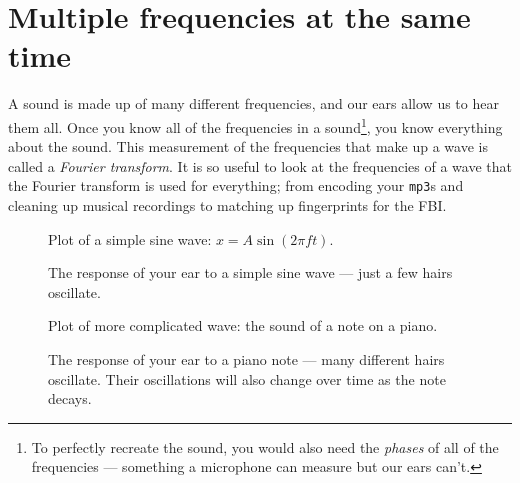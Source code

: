 \documentclass{article}
\begin{document}
\section*{Multiple frequencies at the same time}
A sound is made up of many different frequencies, and our ears allow
us to hear them all.  Once you know all of the frequencies in a
sound\footnote{To perfectly recreate the sound, you would also need
the {\it phases} of all of the frequencies --- something a microphone
can measure but our ears can't.}, you know everything about the sound.
This measurement of the frequencies that make up a wave is called a
{\it Fourier transform}.  It is so useful to look at the frequencies
of a wave that the Fourier transform is used for everything; from
encoding your \verb^mp3^s and cleaning up musical recordings to
matching up fingerprints for the FBI.

\begin{figure}[h]
\begin{center}
	
	\caption{Plot of a simple sine wave: $x = A \sin(2\pi f t)$. }
	\label{sine_wave}
\end{center}
\end{figure}
\begin{figure}[h]
\begin{center}
	
	\caption{The response of your ear to a simple sine wave ---
	just a few hairs oscillate.}
	\label{sine_wave.f}
\end{center}
\end{figure}

\begin{figure}[h]
\begin{center}
	
	\caption{Plot of more complicated wave: the sound of a note on
	a piano. }
	\label{sine_wave}
\end{center}
\end{figure}
\begin{figure}[h]
\begin{center}
	
	\caption{The response of your ear to a piano note ---
	many different hairs oscillate.  Their oscillations will also
	change over time as the note decays.}
	\label{sine_wave.f}
\end{center}
\end{figure}
\end{document}

